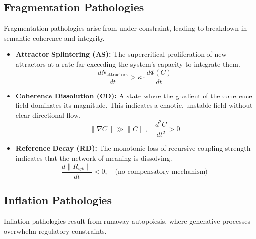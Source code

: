 
\subsection{Fragmentation Pathologies}
\label{16.1.2:fragmentation_pathologies}

Fragmentation pathologies arise from under-constraint, leading to breakdown in semantic coherence and integrity.

\begin{itemize}
    
    \item \textbf{Attractor Splintering (AS):} The supercritical proliferation of new attractors at a rate far exceeding the system's capacity to integrate them.
    \begin{equation}
    \frac{dN_{\text{attractors}}}{dt} > \kappa \cdot \frac{d\Phi(C)}{dt}
    \end{equation}

    \item \textbf{Coherence Dissolution (CD):} A state where the gradient of the coherence field dominates its magnitude. This indicates a chaotic, unstable field without clear directional flow.
    \begin{equation}
    \|\nabla C\| \gg \|C\|, \quad \frac{d^2C}{dt^2} > 0
    \end{equation}

    \item \textbf{Reference Decay (RD):} The monotonic loss of recursive coupling strength indicates that the network of meaning is dissolving.
    \begin{equation}
    \frac{d\|R_{ijk}\|}{dt} < 0, \quad \text{(no compensatory mechanism)}
    \end{equation}

\end{itemize}


\subsection{Inflation Pathologies}
\label{16.1.3:inflation_pathologies}

Inflation pathologies result from runaway autopoiesis, where generative processes overwhelm regulatory constraints.

